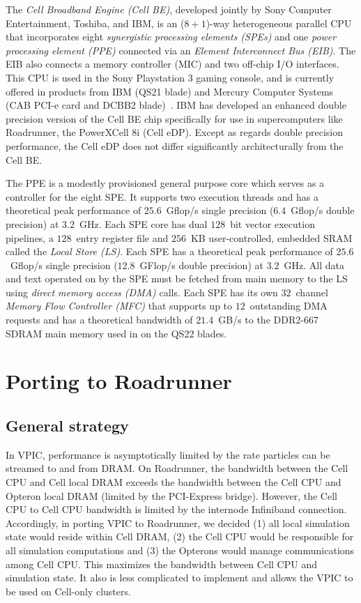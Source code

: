 \documentclass[journal,twoside]{IEEEtran}
\begin{document}
The \emph{Cell Broadband Engine (Cell BE)}, developed jointly by Sony
Computer Entertainment, Toshiba, and IBM, is an ($8+1$)-way
heterogeneous parallel CPU that incorporates eight
\emph{synergistic processing elements (SPEs)} and one
\emph{power processing element (PPE)} connected via an
\emph{Element Interconnect Bus (EIB)}.  The EIB also connects
a memory controller (MIC) and two off-chip I/O interfaces.  This CPU
is used in the Sony Playstation 3 gaming console, and is currently
offered in products from IBM (QS21 blade) and Mercury Computer Systems
(CAB PCI-e card and DCBB2 blade)~\cite{mercury}.  IBM has developed an
enhanced double precision version of the Cell BE chip specifically for
use in supercomputers like Roadrunner, the PowerXCell 8i (Cell eDP).
Except as regards double precision performance, the Cell eDP does not
differ significantly architecturally from the Cell BE.

The PPE is a modestly provisioned general purpose core which serves as
a controller for the eight SPE.  It supports two execution threads and
has a theoretical peak performance of $25.6$~Gflop/s single precision
($6.4$~Gflop/s double precision) at $3.2$~GHz.  Each SPE core has dual
$128$~bit vector execution pipelines, a $128$~entry register file and
$256$~KB user-controlled, embedded SRAM called the \emph{Local Store
(LS)}.  Each SPE has a theoretical peak performance of $25.6$~Gflop/s
single precision ($12.8$~GFlop/s double precision) at $3.2$~GHz.  All
data and text operated on by the SPE must be fetched from main memory
to the LS using \emph{direct memory access (DMA)} calls.  Each SPE has
its own $32$~channel \emph{Memory Flow Controller (MFC)} that supports
up to $12$~outstanding DMA requests and has a theoretical bandwidth of
$21.4$~GB/s to the DDR2-667 SDRAM main memory used in on the QS22
blades.

\section{Porting to Roadrunner}

\subsection{General strategy}

In VPIC, performance is asymptotically limited by the rate particles
can be streamed to and from DRAM.  On Roadrunner, the bandwidth
between the Cell CPU and Cell local DRAM exceeds the bandwidth between
the Cell CPU and Opteron local DRAM (limited by the PCI-Express
bridge).  However, the Cell CPU to Cell CPU bandwidth is limited by
the internode Infiniband connection.  Accordingly, in porting VPIC to
Roadrunner, we decided (1) all local simulation state would reside
within Cell DRAM, (2) the Cell CPU would be responsible for all
simulation computations and (3) the Opterons would manage
communications among Cell CPU.  This maximizes the bandwidth between
Cell CPU and simulation state.  It also is less complicated to
implement and allows the VPIC to be used on Cell-only clusters.
\end{document}
